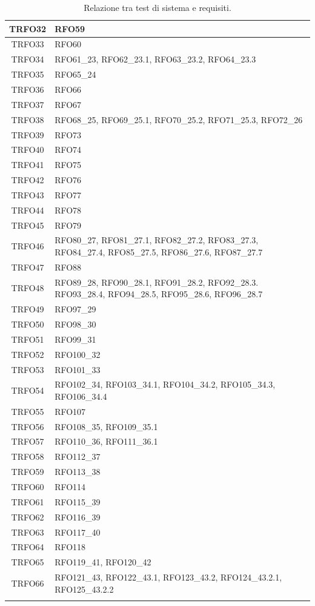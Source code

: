 \begin{longtable}{|c| C{13cm}|}
	TRFO32 & RFO59\\ \hline
	TRFO33 & RFO60\\ \hline
	TRFO34 & RFO61\_23, RFO62\_23.1, RFO63\_23.2, RFO64\_23.3\\ \hline
	TRFO35 & RFO65\_24\\ \hline
	TRFO36 & RFO66\\ \hline
	TRFO37 & RFO67\\ \hline
	TRFO38 & RFO68\_25, RFO69\_25.1, RFO70\_25.2, RFO71\_25.3, RFO72\_26\\ \hline
	TRFO39 & RFO73\\ \hline
	TRFO40 & RFO74\\ \hline
	TRFO41 & RFO75\\ \hline
	TRFO42 & RFO76\\ \hline
	TRFO43 & RFO77\\ \hline
	TRFO44 & RFO78\\ \hline
	TRFO45 & RFO79\\ \hline
	TRFO46 & RFO80\_27, RFO81\_27.1, RFO82\_27.2, RFO83\_27.3, RFO84\_27.4, RFO85\_27.5, RFO86\_27.6, RFO87\_27.7\\ \hline
	TRFO47 & RFO88\\ \hline
	TRFO48 & RFO89\_28, RFO90\_28.1, RFO91\_28.2, RFO92\_28.3. RFO93\_28.4, RFO94\_28.5, RFO95\_28.6, RFO96\_28.7\\ \hline
	TRFO49 & RFO97\_29\\ \hline
	TRFO50 & RFO98\_30\\ \hline
	TRFO51 & RFO99\_31\\ \hline
	TRFO52 & RFO100\_32\\ \hline
	TRFO53 & RFO101\_33\\ \hline
	TRFO54 & RFO102\_34, RFO103\_34.1, RFO104\_34.2, RFO105\_34.3, RFO106\_34.4\\ \hline
	TRFO55 & RFO107\\ \hline
	TRFO56 & RFO108\_35, RFO109\_35.1\\ \hline
	TRFO57 & RFO110\_36, RFO111\_36.1\\ \hline
	TRFO58 & RFO112\_37\\ \hline
	TRFO59 & RFO113\_38\\ \hline
	TRFO60 & RFO114\\ \hline
	TRFO61 & RFO115\_39\\ \hline
	TRFO62 & RFO116\_39\\ \hline
	TRFO63 & RFO117\_40\\ \hline
	TRFO64 & RFO118\\ \hline
	TRFO65 & RFO119\_41, RFO120\_42\\ \hline
	TRFO66 & RFO121\_43, RFO122\_43.1, RFO123\_43.2, RFO124\_43.2.1, RFO125\_43.2.2\\ \hline
	\caption{Relazione tra test di sistema e requisiti.}\\
\end{longtable}
\newpage
